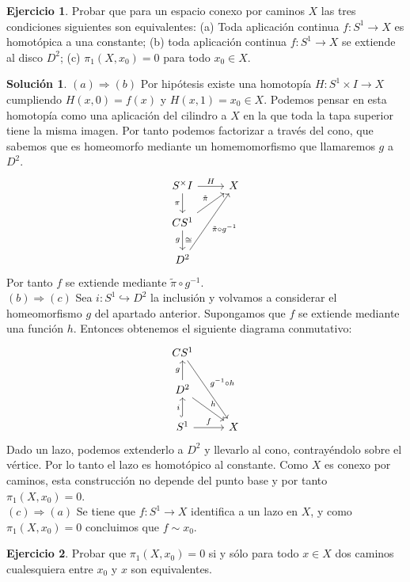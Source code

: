 \documentclass{article}
\theoremstyle{plain}
\theoremstyle{definition}
\newtheorem{exercise}{Ejercicio}
\newtheorem*{sol*}{Solución}
\begin{document}
\newpage \begin{exercise} Probar que para un espacio conexo por caminos $X$ las tres condiciones siguientes son equivalentes:
(a) Toda aplicación continua $f: S^1\to X$ es homotópica a una constante; (b) toda aplicación continua $f: S ^1 \to X$ se extiende al disco $D^2$;
(c) $\pi_1(X,x_0) = 0$ para todo $x_0\in X$.
\end{exercise}
\begin{sol*}
$\boxed{(a)\Rightarrow(b)}$ Por hipótesis existe una homotopía $H:S^1\times I\to X$ cumpliendo $H(x,0)=f(x)$ y $H(x,1)=x_0\in X$. Podemos pensar en esta homotopía como una aplicación del cilindro a $X$ en la que toda la tapa superior tiene la misma imagen. Por tanto podemos factorizar a través del cono, que sabemos que es homeomorfo mediante un homemomorfismo que llamaremos $g$ a $D^2$.
\[
\begin{tikzcd}
S^\times I\arrow[r,"H"]\arrow[d,"\pi"']& X\\
CS^1\arrow[ur,"\tilde{\pi}"]\arrow[d,"g"',"\cong"]\\
D^2\arrow[uur,"\tilde{\pi}\circ g^{-1}"']
\end{tikzcd}
\]
Por tanto $f$ se extiende mediante $\tilde{\pi}\circ g^{-1}$.\\
$\boxed{(b)\Rightarrow(c)}$ Sea $i:S^1\hookrightarrow D^2$ la inclusión y volvamos a considerar el homeomorfismo $g$ del apartado anterior. Supongamos que $f$ se extiende mediante una función $h$. Entonces obtenemos el siguiente diagrama conmutativo:
\[
\begin{tikzcd}
CS^1\arrow[ddr,"g^{-1}\circ h"]\\
D^2\arrow[u,"g"]\arrow[dr,"h"]\\
S^1\arrow[u,"i",hookrightarrow]\arrow[r,"f"]& X
\end{tikzcd}
\]
Dado un lazo, podemos extenderlo a $D^2$ y llevarlo al cono, contrayéndolo sobre el vértice. Por lo tanto el lazo es homotópico al constante. Como $X$ es conexo por caminos, esta construcción no depende del punto base y por tanto $\pi_1(X,x_0)=0$.\\
$\boxed{(c)\Rightarrow(a)}$ Se tiene que $f:S^1\to X$ identifica a un lazo en $X$, y como $\pi_1(X,x_0)=0$ concluimos que $f\sim x_0$.
\end{sol*}
\newpage 

\begin{exercise}
Probar que $\pi_1(X,x_0) = 0$ si y sólo para todo $x\in X$ dos caminos cualesquiera entre $x_0$ y $x$ son equivalentes.
\end{exercise}
\end{document}
